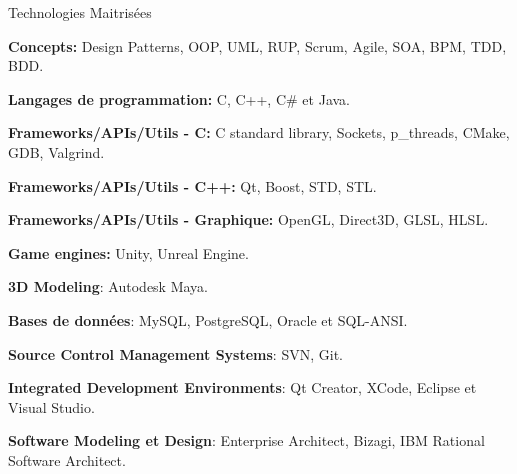 \documentclass{resume}
\begin{document}
  \begin{rSection}{Technologies Maitrisées}
    \begin{rSubsection}{}{}{}{}
      \item {\bf Concepts:} Design Patterns, OOP, UML, RUP, Scrum, Agile, SOA, BPM, TDD, BDD.
      \item {\bf Langages de programmation:} C, C++, C\# et Java.
      \item {\bf Frameworks/APIs/Utils - C:} C standard library, Sockets, p\_threads, CMake, GDB, Valgrind.
      \item {\bf Frameworks/APIs/Utils - C++:} Qt, Boost, STD, STL.
      \item {\bf Frameworks/APIs/Utils - Graphique:} OpenGL, Direct3D, GLSL, HLSL.
      \item {\bf Game engines:} Unity, Unreal Engine.
      \item {\bf 3D Modeling}: Autodesk Maya.
      \item {\bf Bases de données}: MySQL, PostgreSQL, Oracle et SQL-ANSI.
      \item {\bf Source Control Management Systems}: SVN, Git.
      \item {\bf Integrated Development Environments}: Qt Creator, XCode, Eclipse et Visual Studio.
      \item {\bf Software Modeling et Design}: Enterprise Architect, Bizagi, IBM Rational Software Architect.
    \end{rSubsection}
  \end{rSection}
\end{document}

